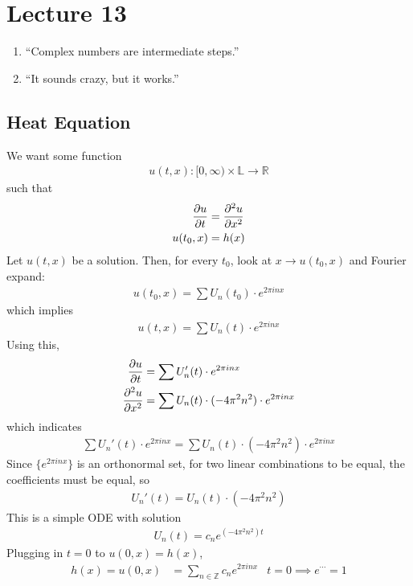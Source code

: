 \section{Lecture 13}
\begin{enumerate}
    \item ``Complex numbers are intermediate steps.''
    \item ``It sounds crazy, but it works.''
\end{enumerate}
\subsection{Heat Equation}
We want some function
\begin{align}
    u(t, x): [0, \infty) \times \mathbb{L} \to \mathbb{R}
\end{align}
such that
\begin{align}
    \pdv{u}{t} &= \pdv[2]{u}{x}\\
    u(t_0, x) &= h(x)
\end{align}
Let $u(t,x)$ be a solution. Then, for every $t_0$, look at $x \to u(t_0, x)$ and Fourier expand:
\begin{align}
    u(t_0, x) = \sum U_n(t_0) \cdot e^{2\pi inx}
\end{align}
which implies
\begin{align}
    u(t, x) = \sum U_n(t) \cdot e^{2\pi inx}
\end{align}
Using this,
\begin{align}
    \pdv{u}{t} &= \sum U_n'(t) \cdot e^{2\pi inx}\\
    \pdv[2]{u}{x} &= \sum U_n(t) \cdot (-4\pi^2n^2) \cdot e^{2\pi inx}
\end{align}
which indicates
\begin{align}
    \sum U_n'(t) \cdot e^{2\pi inx} = \sum U_n(t) \cdot (-4\pi^2n^2) \cdot e^{2\pi inx}
\end{align}
Since $\{ e^{2\pi inx} \}$ is an orthonormal set, for two linear combinations to be equal, the coefficients must be equal, so 
\begin{align}
    U_n'(t) = U_n(t) \cdot (-4\pi^2n^2)
\end{align}
This is a simple ODE with solution
\begin{align}
    U_n(t) = c_n e^{(-4\pi^2n^2)t}
\end{align}
Plugging in $t=0$ to $u(0, x) = h(x)$,
\begin{align}
    h(x) = u(0, x) &= \sum_{n \in \mathbb{Z}} c_n e^{2\pi inx} & t = 0 \implies e^{\cdots} = 1
\end{align}

